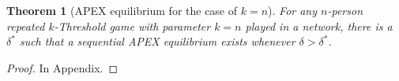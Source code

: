 \documentclass[12pt,letter]{article}
\newtheorem{theorem}{Theorem}
\theoremstyle{definition}
\theoremstyle{remark}
\theoremstyle{claim}
\begin{document}
\begin{theorem}[APEX equilibrium for the case of $k=n$]
\label{thm_minor_thm}
For any $n$-person repeated $k$-Threshold game with parameter $k=n$ played in a network, there is a $\delta^{*}$ such that a sequential APEX equilibrium exists whenever $\delta >
\delta^{*}$.
\end{theorem}
\begin{proof}
In Appendix.
\end{proof}
%
%
%
%
\end{document}
